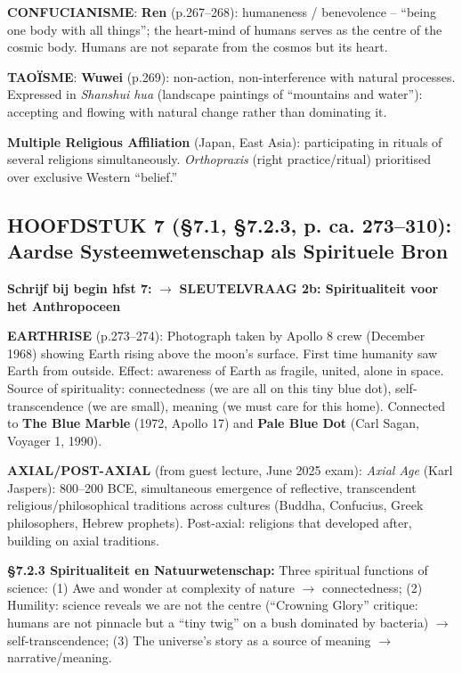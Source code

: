 \documentclass[a4paper,10pt]{article}
\begin{document}
\textbf{CONFUCIANISME}: \textbf{Ren} (p.267--268): humaneness / benevolence -- ``being one body with all things''; the heart-mind of humans serves as the centre of the cosmic body. Humans are not separate from the cosmos but its heart.

\textbf{TAOÏSME}: \textbf{Wuwei} (p.269): non-action, non-interference with natural processes. Expressed in \textit{Shanshui hua} (landscape paintings of ``mountains and water''): accepting and flowing with natural change rather than dominating it.

\textbf{Multiple Religious Affiliation} (Japan, East Asia): participating in rituals of several religions simultaneously. \textit{Orthopraxis} (right practice/ritual) prioritised over exclusive Western ``belief.''

\vspace{3pt}

\subsection{HOOFDSTUK 7 (§7.1, §7.2.3, p. ca. 273--310): Aardse Systeemwetenschap als Spirituele Bron}

\textbf{Schrijf bij begin hfst 7:} $\to$ \textbf{SLEUTELVRAAG 2b: Spiritualiteit voor het Anthropoceen}

\textbf{EARTHRISE} (p.273--274): Photograph taken by Apollo 8 crew (December 1968) showing Earth rising above the moon's surface. First time humanity saw Earth from outside. Effect: awareness of Earth as fragile, united, alone in space. Source of spirituality: connectedness (we are all on this tiny blue dot), self-transcendence (we are small), meaning (we must care for this home). Connected to \textbf{The Blue Marble} (1972, Apollo 17) and \textbf{Pale Blue Dot} (Carl Sagan, Voyager 1, 1990).

\textbf{AXIAL/POST-AXIAL} (from guest lecture, June 2025 exam): \textit{Axial Age} (Karl Jaspers): 800--200 BCE, simultaneous emergence of reflective, transcendent religious/philosophical traditions across cultures (Buddha, Confucius, Greek philosophers, Hebrew prophets). Post-axial: religions that developed after, building on axial traditions.

\textbf{§7.2.3 Spiritualiteit en Natuurwetenschap:}
Three spiritual functions of science: (1) Awe and wonder at complexity of nature $\to$ connectedness; (2) Humility: science reveals we are not the centre (``Crowning Glory'' critique: humans are not pinnacle but a ``tiny twig'' on a bush dominated by bacteria) $\to$ self-transcendence; (3) The universe's story as a source of meaning $\to$ narrative/meaning.
\end{document}

